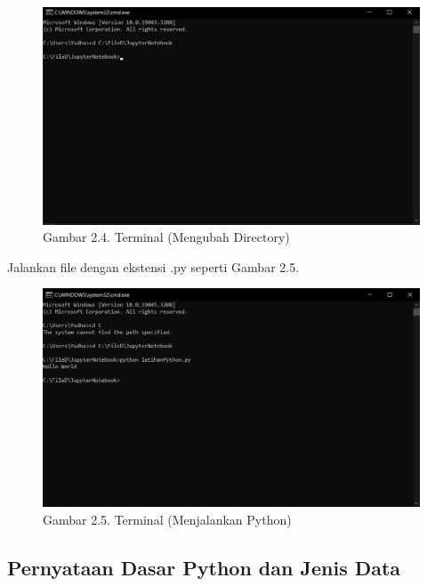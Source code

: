 \documentclass[
  letterpaper,
  DIV=11,
  numbers=noendperiod]{scrreprt}
\begin{document}
\begin{figure}

{\centering \includegraphics{Asset/image9.png}

}

\caption{Gambar 2.4. Terminal (Mengubah Directory)}

\end{figure}

Jalankan file dengan ekstensi .py seperti Gambar 2.5.

\begin{figure}

{\centering \includegraphics{Asset/image10.png}

}

\caption{Gambar 2.5. Terminal (Menjalankan Python)}

\end{figure}

\hypertarget{pernyataan-dasar-python-dan-jenis-data}{%
\subsection*{Pernyataan Dasar Python dan Jenis
Data}\label{pernyataan-dasar-python-dan-jenis-data}}
\end{document}
